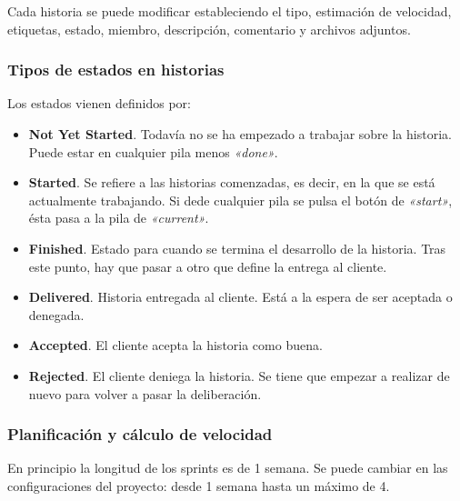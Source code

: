       Cada historia se puede modificar estableciendo el tipo, estimación de velocidad, etiquetas, estado, miembro, descripción, comentario y archivos adjuntos.
    
    \subsubsection{Tipos de estados en historias} %
    \label{ssub:tipos_de_estados_en_historias}
    
      Los estados vienen definidos por:
      \begin{itemize}
        \item {\bf Not Yet Started}. Todavía no se ha empezado a trabajar sobre la historia. Puede estar en cualquier pila menos {\it «done»}. 
        \item {\bf Started}. Se refiere a las historias comenzadas, es decir, en la que se está actualmente trabajando. Si dede cualquier pila se pulsa el botón de {\it «start»}, ésta pasa a la pila de {\it «current»}.
        \item {\bf Finished}. Estado para cuando se termina el desarrollo de la historia. Tras este punto, hay que pasar a otro que define la entrega al cliente.
        \item {\bf Delivered}. Historia entregada al cliente. Está a la espera de ser aceptada o denegada.
        \item {\bf Accepted}. El cliente acepta la historia como buena.
        \item {\bf Rejected}. El cliente deniega la historia. Se tiene que empezar a realizar de nuevo para volver a pasar la deliberación. 
      \end{itemize}
      
    
    \subsubsection{Planificación y cálculo de velocidad} %
    \label{ssub:planificacion_y_calculo_de_velocidad}
      
      En principio la longitud de los sprints es de 1 semana. Se puede cambiar en las configuraciones del proyecto:  desde 1 semana hasta un máximo de 4.


